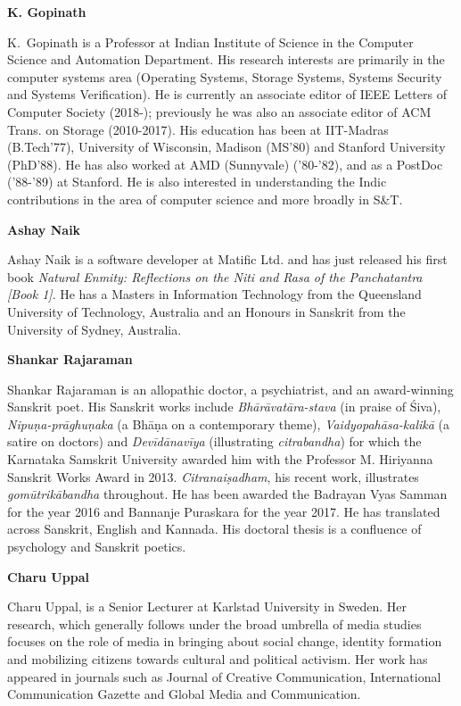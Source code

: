 \bigskip
\noindent
{\large\bf K. Gopinath}
\medskip

K.~Gopinath is a Professor at Indian Institute of Science in the Computer Science and
Automation Department. His research interests are primarily in the computer systems area
(Operating Systems, Storage Systems, Systems Security and Systems Verification). He is
currently an associate editor of IEEE Letters of Computer Society (2018-); previously he was
also an associate editor of ACM Trans. on Storage (2010-2017). His education has been at
IIT-Madras (B.Tech'77), University of Wisconsin, Madison (MS'80) and Stanford University
(PhD'88). He has also worked at AMD (Sunnyvale) ('80-'82), and as a PostDoc ('88-'89) at
Stanford. He is also interested in understanding the Indic contributions in the area of
computer science and more broadly in S\&T.

\bigskip
\noindent
{\large\bf Ashay Naik}
\medskip

Ashay Naik is a software developer at Matific Ltd. and has just released his first book
\textsl{Natural Enmity: Reflections on the Niti and Rasa of the Panchatantra [Book 1]}. He has a
Masters in Information Technology from the Queensland University of Technology,
Australia and an Honours in Sanskrit from the University of Sydney, Australia.

\bigskip
\noindent
{\large\bf Shankar Rajaraman}
\medskip

Shankar Rajaraman is an allopathic doctor, a psychiatrist, and an award-winning Sanskrit
poet. His Sanskrit works include \textsl{Bhārāvatāra-stava} (in praise of Śiva), \textsl{Nipuṇa-prāghuṇaka} (a Bhāṇa on a contemporary theme), \textsl{Vaidyopahāsa-kalikā} (a satire on doctors) and \textsl{Devīdānavīya} (illustrating \textsl{citrabandha}) for which the Karnataka Samskrit University awarded him with the Professor M. Hiriyanna Sanskrit Works Award in 2013. \textsl{Citranaiṣadham}, his recent work, illustrates \textsl{gomūtrikābandha} throughout. He has been awarded the Badrayan Vyas Samman for the year 2016 and Bannanje Puraskara
for the year 2017. He has translated across Sanskrit, English and Kannada. His doctoral thesis is a confluence of psychology and Sanskrit poetics.

\bigskip
\hfill {\large\bf Charu Uppal}
\medskip

Charu Uppal, is a Senior Lecturer at Karlstad University in Sweden. Her research, which generally follows under the broad umbrella of media studies focuses on the role of media in bringing about social change, identity formation and mobilizing citizens towards cultural and political activism. Her work has appeared in journals such as Journal of Creative Communication, International Communication Gazette and Global Media and Communication.
